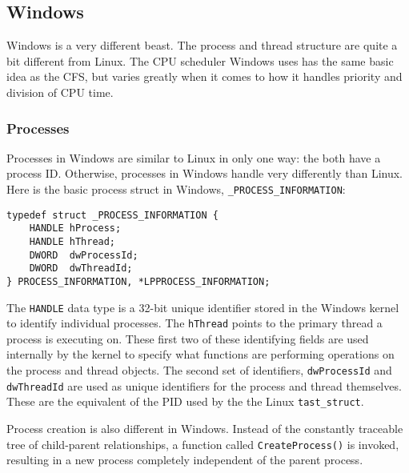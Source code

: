 \documentclass[10pt,letterpaper,onecolumn,draftclsnofoot]{IEEEtran}
\begin{document}

\subsection{Windows}
Windows is a very different beast. The process and thread structure are quite a
bit different from Linux. The CPU scheduler Windows uses has the same basic idea
as the CFS, but varies greatly when it comes to how it handles priority and division
of CPU time.
\subsubsection{Processes}
Processes in Windows are similar to Linux in only one way: the both have a
process ID. Otherwise, processes in Windows handle very differently than Linux.
Here is the basic process struct in Windows, \texttt{\_PROCESS\_INFORMATION}:
\cite{msprocstruct2016}

\begin{lstlisting}[caption=The Windows \_PROCESS\_INFORMATION Structure is how Windows
tracks some important information about each thread and process]
typedef struct _PROCESS_INFORMATION {
	HANDLE hProcess;
	HANDLE hThread;
	DWORD  dwProcessId;
	DWORD  dwThreadId;
} PROCESS_INFORMATION, *LPPROCESS_INFORMATION;
\end{lstlisting}

The \texttt{HANDLE} data type is a 32-bit unique identifier stored in the Windows
kernel to identify individual processes.\cite{mshandle2016} The \texttt{hThread}
points to the primary thread a process is executing on. These first two of these
identifying fields are used internally by the kernel to specify what functions
are performing operations on the process and thread objects. The second set of
identifiers, \texttt{dwProcessId} and \texttt{dwThreadId} are used as unique
identifiers for the process and thread themselves. These are the equivalent of
the PID used by the the Linux \texttt{tast\_struct}.

Process creation is also different in Windows. Instead of the constantly traceable
tree of child-parent relationships, a function called \texttt{CreateProcess()} is
invoked, resulting in a new process completely independent of the parent process.
\cite{msproccreate2016}
\end{document}
